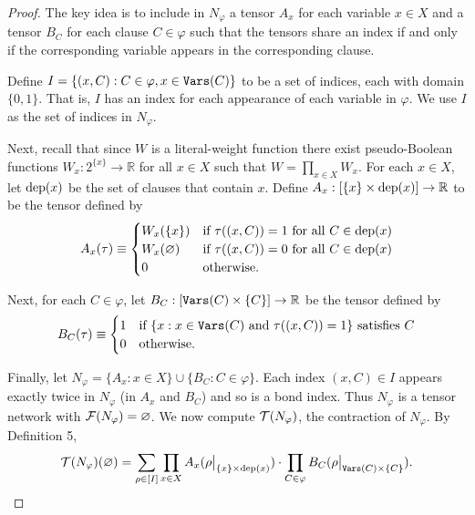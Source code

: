 \begin{proof}
The key idea is to include in $N_\varphi$ a tensor $A_x$ for each variable $x \in X$ and a tensor $B_C$ for each clause $C \in \varphi$ such that the tensors share an index if and only if the corresponding variable appears in the corresponding clause.

Define $I = \{(x, C) : C \in \varphi, x \in \texttt{\upshape Vars}(C)\}$ to be a set of indices, each with domain $\{0, 1\}$. That is, $I$ has an index for each appearance of each variable in $\varphi$. We use $I$ as the set of indices in $N_\varphi$.

Next, recall that since $W$ is a literal-weight function there exist pseudo-Boolean functions $W_x: 2^{\{x\}} \rightarrow \mathbb{R}$ for all $x \in X$ such that $W = \prod_{x \in X} W_x$. For each $x \in X$, let $\text{dep}(x)$ be the set of clauses that contain $x$. Define $A_x: [\{x\} \times \text{dep}(x)] \rightarrow \mathbb{R}$ to be the tensor defined by $$A_x(\tau) \equiv \begin{cases}W_x(\{x\})&\text{if}~\tau((x,C)) = 1~\text{for all}~C \in \text{dep}(x)\\W_x(\varnothing)&\text{if}~\tau((x,C)) = 0~\text{for all}~C \in \text{dep}(x)\\0&\text{otherwise.}\end{cases}$$

Next, for each $C \in \varphi$, let $B_C: [\texttt{\upshape Vars}(C) \times \{C\}] \rightarrow \mathbb{R}$ be the tensor defined by
$$B_C(\tau) \equiv \begin{cases}1& \text{if}~\{x: x \in \texttt{\upshape Vars}(C)~\text{and}~\tau((x, C)) = 1\}~\text{satisfies}~C\\0&\text{otherwise.}\end{cases}$$

Finally, let $N_\varphi = \{ A_x : x \in X\} \cup \{B_C : C \in \varphi\}$. Each index $(x, C) \in I$ appears exactly twice in $N_\varphi$ (in $A_x$ and $B_C$) and so is a bond index. Thus $N_\varphi$ is a tensor network with $\mathcal{F}(N_\varphi) = \varnothing$. We now compute $\mathcal{T}(N_\varphi)$, the contraction of $N_\varphi$. By Definition 5,
$$\mathcal{T}(N_\varphi)(\varnothing) = \sum_{\rho \in [I]} \prod_{x \in X} A_x(\rho\big|_{\{x\} \times \text{dep}(x)}) \cdot \prod_{C \in \varphi} B_C(\rho\big|_{\texttt{\upshape Vars}(C) \times \{C\}}).$$


\end{proof}
